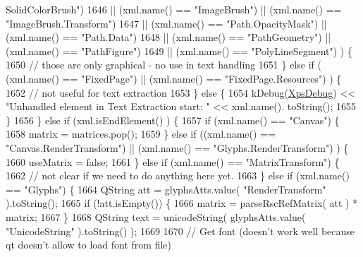 \begin{DoxyCode}
{      SolidColorBrush"})
1646                         || (xml.name() == \textcolor{stringliteral}{"ImageBrush"}) ||  (xml.name() == \textcolor{stringliteral}{"ImageBrush.Transform"})
1647                         || (xml.name() == \textcolor{stringliteral}{"Path.OpacityMask"}) || (xml.name() == \textcolor{stringliteral}{"Path.Data"})
1648                         || (xml.name() == \textcolor{stringliteral}{"PathGeometry"}) || (xml.name() == \textcolor{stringliteral}{"PathFigure"})
1649                         || (xml.name() == \textcolor{stringliteral}{"PolyLineSegment"}) ) \{
1650                 \textcolor{comment}{// those are only graphical - no use in text handling}
1651             \} \textcolor{keywordflow}{else} \textcolor{keywordflow}{if} ( (xml.name() == \textcolor{stringliteral}{"FixedPage"}) || (xml.name() == \textcolor{stringliteral}{"FixedPage.Resources"}) ) \{
1652                 \textcolor{comment}{// not useful for text extraction}
1653             \} \textcolor{keywordflow}{else} \{
1654                 kDebug(\hyperlink{generator__xps_8cpp_a00c0825a8bf77ed142d9a5a205d66f3c}{XpsDebug}) << \textcolor{stringliteral}{"Unhandled element in Text Extraction start: "} << xml.name().
      toString();
1655             \}
1656         \} \textcolor{keywordflow}{else} \textcolor{keywordflow}{if} (xml.isEndElement() ) \{
1657             \textcolor{keywordflow}{if} (xml.name() == \textcolor{stringliteral}{"Canvas"}) \{
1658                 matrix = matrices.pop();
1659             \} \textcolor{keywordflow}{else} \textcolor{keywordflow}{if} ((xml.name() == \textcolor{stringliteral}{"Canvas.RenderTransform"}) || (xml.name() == \textcolor{stringliteral}{"Glyphs.RenderTransform"})
      ) \{
1660                 useMatrix = \textcolor{keyword}{false};
1661             \} \textcolor{keywordflow}{else} \textcolor{keywordflow}{if} (xml.name() == \textcolor{stringliteral}{"MatrixTransform"}) \{
1662                 \textcolor{comment}{// not clear if we need to do anything here yet.}
1663             \} \textcolor{keywordflow}{else} \textcolor{keywordflow}{if} (xml.name() == \textcolor{stringliteral}{"Glyphs"}) \{
1664                 QString att = glyphsAtts.value( \textcolor{stringliteral}{"RenderTransform"} ).toString();
1665                 \textcolor{keywordflow}{if} (!att.isEmpty()) \{
1666                     matrix = parseRscRefMatrix( att ) * matrix;
1667                 \}
1668                 QString text = unicodeString( glyphsAtts.value( \textcolor{stringliteral}{"UnicodeString"} ).toString() );
1669 
1670                 \textcolor{comment}{// Get font (doesn't work well because qt doesn't allow to load font from file)}

\end{DoxyCode}
